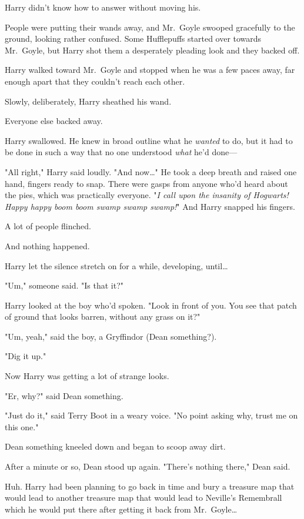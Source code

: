 Harry didn't know how to answer without moving his.

People were putting their wands away, and Mr.~Goyle swooped gracefully to the 
ground, looking rather confused. Some Hufflepuffs started over towards 
Mr.~Goyle, but Harry shot them a desperately pleading look and they backed off.

Harry walked toward Mr.~Goyle and stopped when he was a few paces away, far 
enough apart that they couldn't reach each other.

Slowly, deliberately, Harry sheathed his wand.

Everyone else backed away.

Harry swallowed. He knew in broad outline what he \emph{wanted} to do, but it 
had to be done in such a way that no one understood \emph{what} he'd done---

"All right," Harry said loudly. "And now{\ldots}" He took a deep breath and 
raised one hand, fingers ready to snap. There were gasps from anyone who'd 
heard about the pies, which was practically everyone. "\emph{I call upon the 
insanity of Hogwarts! Happy happy boom boom swamp swamp swamp!}" And Harry 
snapped his fingers.

A lot of people flinched.

And nothing happened.

Harry let the silence stretch on for a while, developing, until{\ldots}

"Um," someone said. "Is that it?"

Harry looked at the boy who'd spoken. "Look in front of you. You see that patch 
of ground that looks barren, without any grass on it?"

"Um, yeah," said the boy, a Gryffindor (Dean something?).

"Dig it up."

Now Harry was getting a lot of strange looks.

"Er, why?" said Dean something.

"Just do it," said Terry Boot in a weary voice. "No point asking why, trust me 
on this one."

Dean something kneeled down and began to scoop away dirt.

After a minute or so, Dean stood up again. "There's nothing there," Dean said.

Huh. Harry had been planning to go back in time and bury a treasure map that 
would lead to another treasure map that would lead to Neville's Remembrall 
which he would put there after getting it back from Mr.~Goyle{\ldots}

